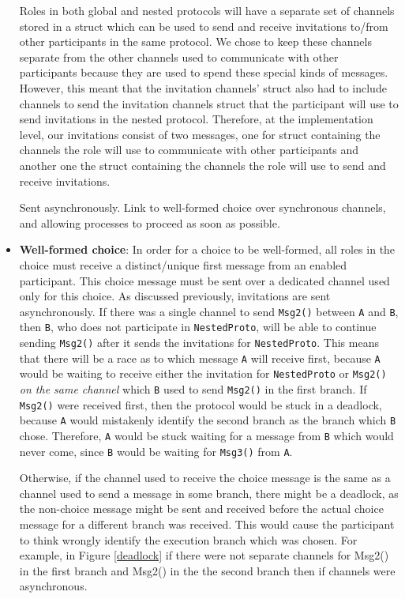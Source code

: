 \documentclass[12pt,twoside]{report}
\begin{document}
\begin{itemize}
    Roles in both global and nested protocols will have a separate set of channels stored in a struct which can be used to send and receive invitations to/from other participants in the same protocol. We chose to keep these channels separate from the other channels used to communicate with other participants because they are used to spend these special kinds of messages. However, this meant that the invitation channels' struct also had to include channels to send the invitation channels struct that the participant will use to send invitations in the nested protocol. Therefore, at the implementation level, our invitations consist of two messages, one for struct containing the channels the role will use to communicate with other participants and another one the struct containing the channels the role will use to send and receive invitations.
    
    Sent asynchronously. 
    Link to well-formed choice over synchronous channels, and allowing processes to proceed as soon as possible.
    
    \item \textbf{Well-formed choice}: In order for a choice to be well-formed, all roles in the choice must receive a distinct/unique first message from an enabled participant. This choice message must be sent over a dedicated channel used only for this choice. As discussed previously, invitations are sent asynchronously. If there was a single channel to send \texttt{Msg2()} between \texttt{A} and \texttt{B}, then \texttt{B}, who does not participate in \texttt{NestedProto}, will be able to continue sending \texttt{Msg2()} after it sends the invitations for \texttt{NestedProto}. This means that there will be a race as to which message \texttt{A} will receive first, because \texttt{A} would be waiting to receive either the invitation for \texttt{NestedProto} or \texttt{Msg2()} \textit{on the same channel} which \texttt{B} used to send \texttt{Msg2()} in the first branch. If \texttt{Msg2()} were received first, then the protocol would be stuck in a deadlock, because \texttt{A} would mistakenly identify the second branch as the branch which \texttt{B} chose. Therefore, \texttt{A} would be stuck waiting for a message from \texttt{B} which would never come, since \texttt{B} would be waiting for \texttt{Msg3()} from \texttt{A}.
    
    Otherwise, if the channel used to receive the choice message is the same as a channel used to send a message in some branch, there might be a deadlock, as the non-choice message might be sent and received before the actual choice message for a different branch was received. This would cause the participant to think wrongly identify the execution branch which was chosen. For example, in Figure \ref{deadlock} if there were not separate channels for Msg2() in the first branch and Msg2() in the the second branch then if channels were asynchronous.
    

\end{itemize}
\end{document}
